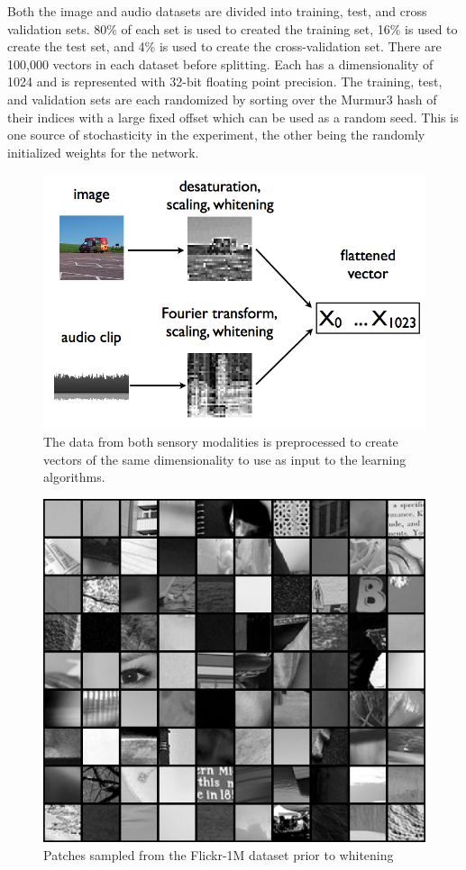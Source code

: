 \documentclass[12pt]{article}
\begin{document}
\begin{doublespacing}
	Both the image and audio datasets are divided into training, test, and cross validation sets. 80\% of each set is used to created the training set, 16\% is used to create the test set, and 4\% is used to create the cross-validation set. There are 100,000 vectors in each dataset before splitting. Each has a dimensionality of 1024 and is represented with 32-bit floating point precision. The training, test, and validation sets are each randomized by sorting over the Murmur3 hash of their indices with a large fixed offset which can be used as a random seed. This is one source of stochasticity in the experiment, the other being the randomly initialized weights for the network.
	
\begin{figure}[p]
\centering
\includegraphics[width=6in]{key1002}
\caption{The data from both sensory modalities is preprocessed to create vectors of the same dimensionality to use as input to the learning algorithms.}
\end{figure}

\begin{figure}[p]
\centering
\includegraphics[width=6in]{patch_arrangment}
\caption{Patches sampled from the Flickr-1M dataset prior to whitening}
\end{figure}
	

\end{doublespacing}
\end{document}

